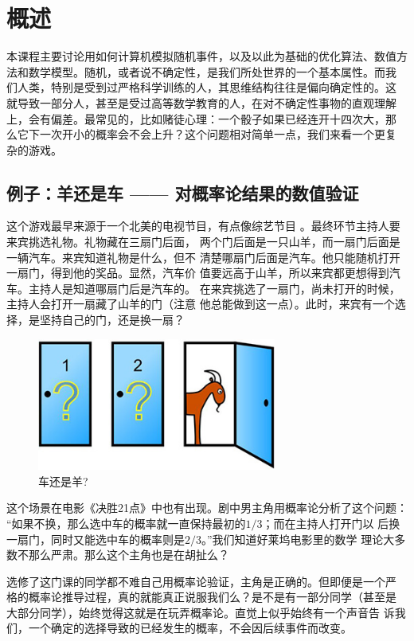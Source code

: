 \chapter{概述}

本课程主要讨论用如何计算机模拟随机事件，以及以此为基础的优化算法、数值方
法和数学模型。随机，或者说不确定性，是我们所处世界的一个基本属性。而我
们人类，特别是受到过严格科学训练的人，其思维结构往往是偏向确定性的。这
就导致一部分人，甚至是受过高等数学教育的人，在对不确定性事物的直观理解
上，会有偏差。最常见的，比如赌徒心理：一个骰子如果已经连开十四次大，那
么它下一次开小的概率会不会上升？这个问题相对简单一点，我们来看一个更复
杂的游戏。

\section{例子：羊还是车 —— 对概率论结果的数值验证}
这个游戏最早来源于一个北美的电视节目，有点像综艺节目
\cite{Blues2016Edos}。最终环节主持人要来宾挑选礼物。礼物藏在三扇门后面，
两个门后面是一只山羊，而一扇门后面是一辆汽车。来宾知道礼物是什么，但不
清楚哪扇门后面是汽车。他只能随机打开一扇门，得到他的奖品。显然，汽车价
值要远高于山羊，所以来宾都更想得到汽车。主持人是知道哪扇门后是汽车的。
在来宾挑选了一扇门，尚未打开的时候，主持人会打开一扇藏了山羊的门（注意
  他总能做到这一点）。此时，来宾有一个选择，是坚持自己的门，还是换一扇？

\begin{figure}[!ht]
\centering
\includegraphics[width=0.7\textwidth]{images/game.jpg}
\caption{车还是羊?}
\label{fig::game}
\end{figure}

这个场景在电影《决胜21点》中也有出现。剧中男主角用概率论分析了这个问题：
``如果不换，那么选中车的概率就一直保持最初的$1/3$；而在主持人打开门以
后换一扇门，同时又能选中车的概率则是$2/3$。''我们知道好莱坞电影里的数学
理论大多数不那么严肃。那么这个主角也是在胡扯么？

选修了这门课的同学都不难自己用概率论验证，主角是正确的。但即便是一个严
格的概率论推导过程，真的就能真正说服我们么？是不是有一部分同学（甚至是
  大部分同学），始终觉得这就是在玩弄概率论。直觉上似乎始终有一个声音告
诉我们，一个确定的选择导致的已经发生的概率，不会因后续事件而改变。

